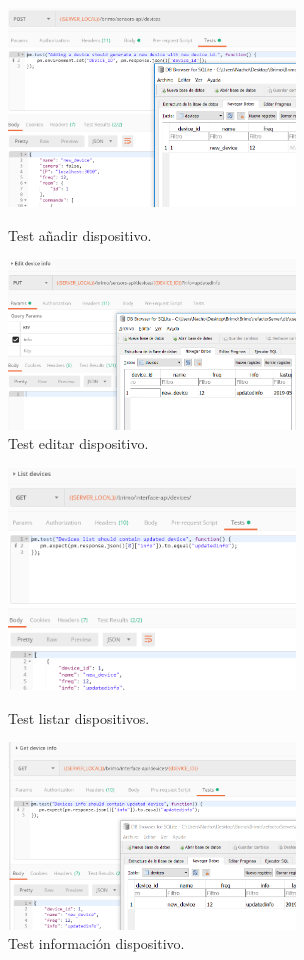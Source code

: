 \begin{figure}[!htb]
\includegraphics[width=3.00in]{images/tests/screenshots/5adddevice.PNG}
\caption{Test añadir dispositivo.}
\endminipage\hfill
{}
\includegraphics[width=3.00in]{images/tests/screenshots/6editdevice.PNG}
\caption{Test editar dispositivo.}
\endminipage\hfill
\end{figure}

\begin{figure}[!htb]
\includegraphics[width=3.00in]{images/tests/screenshots/7list_devices.PNG}
\caption{Test listar dispositivos.}
\endminipage\hfill
{}
\includegraphics[width=3.00in]{images/tests/screenshots/8device_info.PNG}
\caption{Test información dispositivo.}
\endminipage\hfill
\end{figure}

